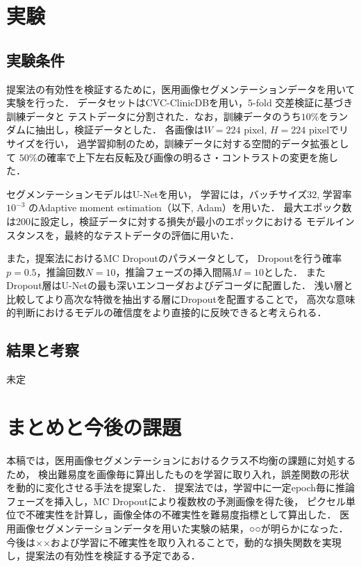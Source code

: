 \documentclass[10pt, a4paper, twocolumn]{jarticle}
\begin{document}
\newpage

\section{実験}
\subsection{実験条件}
提案法の有効性を検証するために，医用画像セグメンテーションデータを用いて実験を行った．
データセットはCVC-ClinicDB\cite{BERNAL201599}を用い，$5$-fold 交差検証に基づき訓練データと
テストデータに分割された．なお，訓練データのうち$10 \%$をランダムに抽出し，検証データとした．
各画像は$W = 224$ pixel, $H = 224$ pixelでリサイズを行い，
過学習抑制のため，訓練データに対する空間的データ拡張として
$50\%$の確率で上下左右反転及び画像の明るさ・コントラストの変更を施した．

セグメンテーションモデルはU-Net\cite{ronneberger2015u}を用い，
学習には，バッチサイズ$32$, 学習率$10 ^ {−3}$ のAdaptive moment
estimation（以下, Adam）\cite{kingma2014adam}を用いた．
最大エポック数は$200$に設定し，検証データに対する損失が最小のエポックにおける
モデルインスタンスを，最終的なテストデータの評価に用いた．

また，提案法におけるMC Dropoutのパラメータとして，
Dropoutを行う確率$p = 0.5$，推論回数$N = 10$，推論フェーズの挿入間隔$M = 10$とした．
またDropout層はU-Netの最も深いエンコーダおよびデコーダに配置した．
浅い層と比較してより高次な特徴を抽出する層にDropoutを配置することで，
高次な意味的判断におけるモデルの確信度をより直接的に反映できると考えられる．

\subsection{結果と考察}
未定

\section{まとめと今後の課題}
本稿では，医用画像セグメンテーションにおけるクラス不均衡の課題に対処するため，
検出難易度を画像毎に算出したものを学習に取り入れ，誤差関数の形状を動的に変化させる手法を提案した．
提案法では，学習中に一定epoch毎に推論フェーズを挿入し，MC Dropoutにより複数枚の予測画像を得た後，
ピクセル単位で不確実性を計算し，画像全体の不確実性を難易度指標として算出した．
医用画像セグメンテーションデータを用いた実験の結果，○○が明らかになった．
今後は××および学習に不確実性を取り入れることで，動的な損失関数を実現し，提案法の有効性を検証する予定である．
\end{document}
